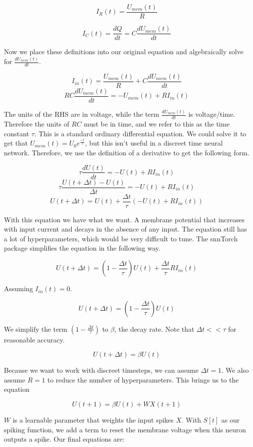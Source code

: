 \documentclass[../taasin.tex]{subfiles}
\begin{document}
$$ I_R(t) = \frac{U_{mem}(t)}{R} $$

$$ I_C(t) = \frac{dQ}{dt} = C \frac{dU_{mem}(t)}{dt} $$

Now we place these definitions into our original equation and algebraically solve for $ \frac{dU_{mem}(t)}{dt} $.

$$ I_{in}(t) = \frac{U_{mem}(t)}{R} + C \frac{dU_{mem}(t)}{dt} $$
$$ RC \frac{dU_{mem}(t)}{dt} = -U_{mem}(t) + RI_{in}(t)$$

The units of the RHS are in voltage, while the term $\frac{dU_{mem}(t)}{dt}$ is voltage/time. Therefore the units of $RC$ must be in time, and we refer to this as the time constant $\tau$. This is a standard ordinary differential equation. We could solve it to get that $ U_{mem}(t) = U_0 e ^{\frac{-t}{\tau}} $, but this isn't useful in a discreet time neural network. Therefore, we use the definition of a derivative to get the following form.

$$ \tau \frac{dU(t)}{dt} = -U(t) + RI_{in}(t) $$
$$ \tau \frac{U(t + \Delta t) - U(t)}{\Delta t}  = -U(t) + RI_{in}(t) $$
$$ U(t + \Delta t) = U(t) + \frac{\Delta t}{\tau} (-U(t) + RI_{in}(t)) $$


With this equation we have what we want. A membrane potential that increases with input current and decays in the absence of any input. The equation still has a lot of hyperparameters, which would be very difficult to tune. The snnTorch package simplifies the equation in the following way.

$$ U(t + \Delta t) = (1 - \frac{\Delta t}{\tau}) U(t) + \frac{\Delta t}{\tau} R I_{in}(t)$$

Assuming $ I_{in}(t) = 0 $.

$$ U(t + \Delta t) = (1 - \frac{\Delta t}{\tau}) U(t) $$

We simplify the term $(1 - \frac{\Delta t}{\tau})$ to $\beta$, the decay rate. Note that $ \Delta t << \tau $ for reasonable accuracy. 

$$ U(t + \Delta t) = \beta U(t) $$

Because we want to work with discreet timesteps, we can assume $\Delta t = 1$. We also assume $R=1$ to reduce the number of hyperparameters. This brings us to the equation

$$ U(t+1) = \beta U(t) + W X(t+1) $$

$W$ is a learnable parameter that weights the input spikes $X$. With $S[t]$ as our spiking function, we add a term to reset the membrane voltage when this neuron outputs a spike. Our final equations are:
\end{document}
